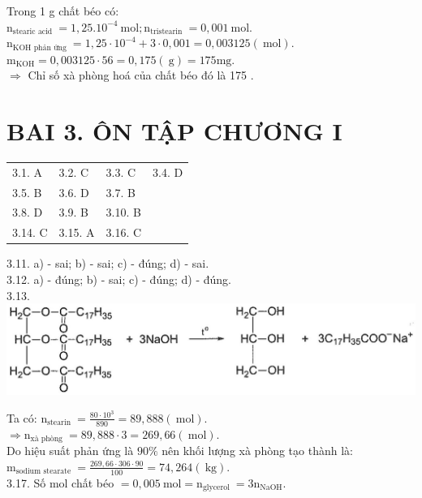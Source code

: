 \documentclass[10pt]{article}
\begin{document}
Trong 1 g chất béo có:\\
$\mathrm{n}_{\text {stearic acid }}=1,25.10^{-4} \mathrm{~mol} ; \mathrm{n}_{\text {tristearin }}=0,001 \mathrm{~mol}$.\\
$\mathrm{n}_{\mathrm{KOH} \text { phản ứng }}=1,25 \cdot 10^{-4}+3 \cdot 0,001=0,003125(\mathrm{~mol})$.\\
$\mathrm{m}_{\mathrm{KOH}}=0,003125 \cdot 56=0,175(\mathrm{~g})=175 \mathrm{mg}$.\\
$\Rightarrow$ Chỉ số xà phòng hoá của chất béo đó là 175 .

\section*{BAI 3. ÔN TẬP CHƯƠNG I}
\begin{center}
\begin{tabular}{llll}
3.1. A & 3.2. C & 3.3. C & 3.4. D \\
3.5. B & 3.6. D & 3.7. B &  \\
3.8. D & 3.9. B & 3.10. B &  \\
3.14. C & 3.15. A & 3.16. C &  \\
\end{tabular}
\end{center}

3.11. a) - sai; b) - sai; c) - đúng; d) - sai.\\
3.12. a) - đúng; b) - sai; c) - đúng; d) - đúng.\\
3.13.\\
\includegraphics[max width=\textwidth, center]{2025_10_23_b82d44049ffb48e891e8g-03}

Ta có: $\mathrm{n}_{\text {stearin }}=\frac{80 \cdot 10^{3}}{890}=89,888(\mathrm{~mol})$.\\
$\Rightarrow \mathrm{n}_{\text {xà phòng }}=89,888 \cdot 3=269,66(\mathrm{~mol})$.\\
Do hiệu suất phản ứng là $90 \%$ nên khối lượng xà phòng tạo thành là:\\
$\mathrm{m}_{\text {sodium stearate }}=\frac{269,66 \cdot 306 \cdot 90}{100}=74,264(\mathrm{~kg})$.\\
3.17. Số mol chất béo $=0,005 \mathrm{~mol}=\mathrm{n}_{\text {glycerol }}=3 \mathrm{n}_{\mathrm{NaOH}}$.
\end{document}
